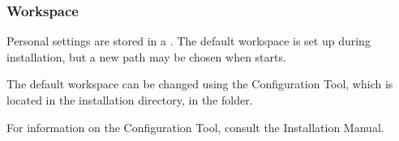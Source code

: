 \subsubsection{Workspace}
Personal settings  are stored in a . 
The default workspace is set up
 during installation, but a new path may be chosen when \GD starts. 

The default workspace can be changed using the Configuration Tool, which is 
located in the \gd installation directory, in the  folder. 

For information on the Configuration Tool, consult the Installation Manual. 
